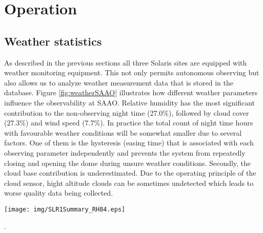 \section{Operation}
\label{sec:Operation}

\subsection{Weather statistics}

As described in the previous sections all three Solaris sites are equipped with weather monitoring equipment. This not only permits autonomous observing but  also allows us to analyze weather measurement data that is stored in the database. Figure \ref{fig:weatherSAAO} illustrates how different weather parameters influence the observability at SAAO. Relative humidity has the most significant contribution to the non-observing night time (27.0\%), followed by cloud cover (27.3\%) and wind speed (7.7\%). In practice the total count of night time hours with favourable weather conditions will be somewhat smaller due to several factors. One of them is the hysteresis (easing time) that is associated with each observing parameter independently and prevents the system from repeatedly closing and opening the  dome during unsure weather conditions. Secondly, the cloud base contribution is underestimated. Due to the operating principle of the cloud sensor, hight altitude clouds can be sometimes undetected which leads to worse quality data being collected.

\begin{figure*}[htb!]
\texttt{[image: img/SLR1Summary\_RH84.eps]}
\caption{Observing conditions analysis for SAAO during 800 days staring 30-04-2013. The top panel shows the amount of night hours per day with weather parameters within allowable limits. Dark hours are defined such that the Sun is lower than 18 degrees below the horizon. A total of 62.0\% of night time had favourable observing conditions. Gaps in the data that are the effect of system downtime or other abnormalities are not taken into account. The three lower panels show the contribution of relative humidity (RH), wind speed and cloud base into the non-observing time. Two wind speed parameters are used - average wind speed and maximum wind speed (the limits are 10 and 12 ms$^{-1}$, respectively). Precipitation is not analysed as it is a subset of the cloud contribution. Current observing limits related to ambient conditions are listed in Tab. \ref{tab:ObservingLimits}}.
\label{fig:weatherSAAO}
\end{figure*}

